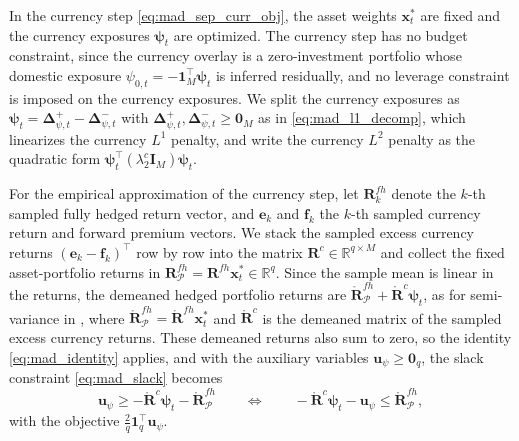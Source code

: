 In the currency step \eqref{eq:mad_sep_curr_obj}, the asset weights $\bm{x}_t^*$ are fixed and the currency exposures
$\bm{\psi}_t$ are optimized. The currency step has no budget constraint, since the currency overlay is a zero-investment
portfolio whose domestic exposure $\psi_{0,t} = -\bm{1}_M^\top \bm{\psi}_t$ is inferred residually, and no leverage
constraint is imposed on the currency exposures. We split the currency exposures as
$\bm{\psi}_t = \bm{\Delta}_{\psi,t}^+ - \bm{\Delta}_{\psi,t}^-$ with $\bm{\Delta}_{\psi,t}^+, \bm{\Delta}_{\psi,t}^- \ge
\bm{0}_M$ as in \eqref{eq:mad_l1_decomp}, which linearizes the currency $L^1$ penalty, and write the currency $L^2$
penalty as the quadratic form $\bm{\psi}_t^\top (\lambda_2^c \bm{I}_M) \bm{\psi}_t$.

For the empirical approximation of the currency step, let $\bm{R}^{fh}_k$ denote the $k$-th sampled fully hedged
return vector, and $\bm{e}_k$ and $\bm{f}_k$ the $k$-th sampled currency return and forward premium vectors. We stack
the sampled excess currency returns $(\bm{e}_k - \bm{f}_k)^\top$ row by row into the matrix
$\bm{R}^c \in \mathbb{R}^{q \times M}$ and collect the fixed asset-portfolio returns in
$\bm{R}^{fh}_{\mathcal{P}} = \bm{R}^{fh} \bm{x}_t^* \in \mathbb{R}^q$. Since the sample mean is linear in the returns, the
demeaned hedged portfolio returns are $\mathring{\bm{R}}^{fh}_{\mathcal{P}} + \mathring{\bm{R}}^c \bm{\psi}_t$, as for
semi-variance in , where $\mathring{\bm{R}}^{fh}_{\mathcal{P}} = \mathring{\bm{R}}^{fh} \bm{x}_t^*$ and
$\mathring{\bm{R}}^c$ is the demeaned matrix of the sampled excess currency returns. These demeaned returns also sum to
zero, so the identity \eqref{eq:mad_identity} applies, and with the auxiliary variables
$\bm{u}_\psi \ge \bm{0}_q$, the slack constraint \eqref{eq:mad_slack} becomes
\begin{equation*}
    \bm{u}_\psi \ge -\mathring{\bm{R}}^c \bm{\psi}_t - \mathring{\bm{R}}^{fh}_{\mathcal{P}}
    \qquad \Longleftrightarrow \qquad
    -\mathring{\bm{R}}^c \bm{\psi}_t - \bm{u}_\psi \le \mathring{\bm{R}}^{fh}_{\mathcal{P}},
\end{equation*}
with the objective $\frac{2}{q} \bm{1}_q^\top \bm{u}_\psi$.

